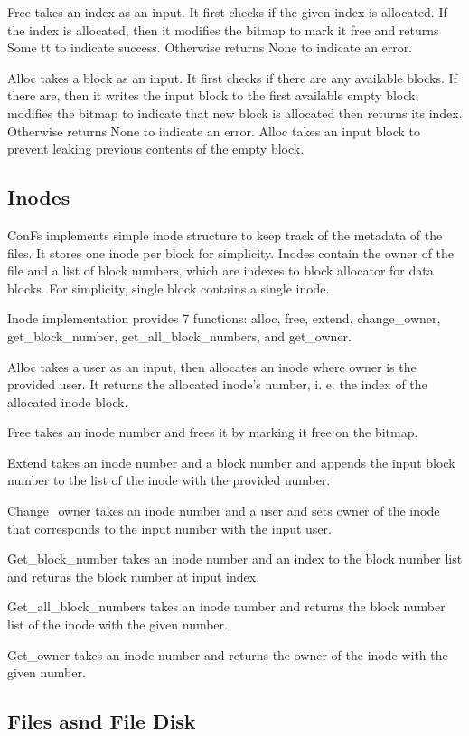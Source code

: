 Free takes an index as an input. It first checks if the given index is allocated. If the index is allocated, then it modifies the bitmap to mark it free and returns Some tt to indicate success. Otherwise returns None to indicate an error.

Alloc takes a block as an input. It first checks if there are any available blocks. If there are, then it writes the input block to the first available empty block, modifies the bitmap to indicate that new block is allocated then returns its index. Otherwise returns None to indicate an error. Alloc takes an input block to prevent leaking previous contents of the empty block.

\subsection{Inodes}
ConFs implements simple inode structure to keep track of the metadata of the files. It stores one inode per block for simplicity. Inodes contain the owner of the file and a list of block numbers, which are indexes to block allocator for data blocks. For simplicity, single block contains a single inode. 

Inode implementation provides 7 functions: alloc, free, extend, change\_owner, get\_block\_number, get\_all\_block\_numbers, and get\_owner.

Alloc takes a user as an input, then allocates an inode where owner is the provided user. It returns the allocated inode's number, i. e. the index of the allocated inode block. 

Free takes an inode number and frees it by marking it free on the bitmap.

Extend takes an inode number and a block number and appends the input block number to the list of the inode with the provided number.

Change\_owner takes an inode number and a user and sets owner of the inode that corresponds to the input number with the input user.

Get\_block\_number takes an inode number and an index to the block number list and returns the block number at input index.

Get\_all\_block\_numbers  takes an inode number and returns the block number list of the inode with the given number.

Get\_owner  takes an inode number and returns the owner of the inode with the given number.

\subsection{Files asnd File Disk}
